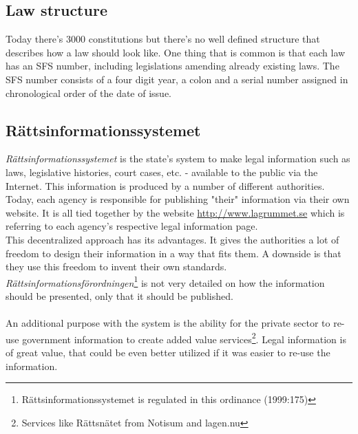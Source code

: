\subsection{Law structure}
Today there's 3000 constitutions but there's no well defined structure that describes how a law should look like. One thing that is common is that each law has an SFS number, including legislations amending already existing laws. The SFS number consists of a four digit year, a colon and a serial number assigned in chronological order of the date of issue. 

\subsection{Rättsinformationssystemet}
\textit{Rättsinformationssystemet} is the state's system to make legal information such as laws, legislative histories, court cases, etc. - available to the public via the Internet. This information is produced by a number of different authorities. Today, each agency is responsible for publishing "their" information via their own website. It is all tied together by the website \url{http://www.lagrummet.se} which is referring to each agency's respective legal information page.\\
This decentralized approach has its advantages. It gives the authorities a lot of freedom to design their information in a way that fits them. A downside is that they use this freedom to invent their own standards. \textit{Rättsinformationsförordningen}\footnote{Rättsinformationssystemet is regulated in this ordinance (1999:175)} is not very detailed on how the information should be presented, only that it should be published.\\\\
An additional purpose with the system is the ability for the private sector to re-use government information to create added value services\footnote{Services like Rättsnätet from Notisum and lagen.nu}. Legal information is of great value, that could be even better utilized if it was easier to re-use the information.
